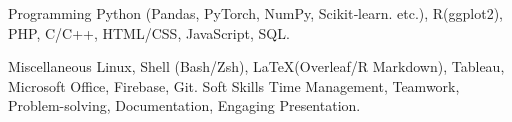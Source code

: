 
\begin{cvskills}

	\cvskill
	{Programming} %
	{Python (Pandas, PyTorch, NumPy, Scikit‑learn. etc.), R(ggplot2), PHP, C/C++, HTML/CSS, JavaScript, SQL.} %

	\cvskill
	{Miscellaneous} %
	{Linux, Shell (Bash/Zsh), \LaTeX (Overleaf/R Markdown), Tableau, Microsoft Office, Firebase, Git.} %
	\cvskill
	{Soft Skills} %
	{Time Management, Teamwork, Problem-solving, Documentation, Engaging Presentation.} %

\end{cvskills}
